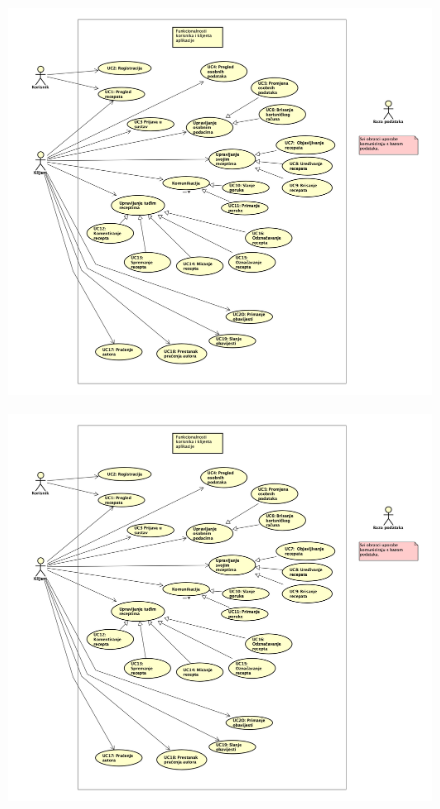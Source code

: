 		\begin{figure}[H]
			\includegraphics[scale=0.1]{dijagrami/Korisnik_klijent.png} 
			\centering
			\caption{}
			\label{fig:id4}
		\end{figure}
		\begin{figure}[H]
			\includegraphics[scale=0.1]{dijagrami/Korisnik_klijent.png} 
			\centering
			\caption{}
			\label{fig:id5}
		\end{figure}
